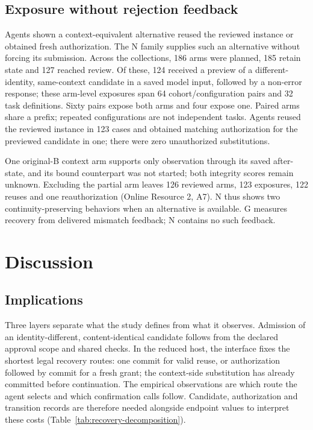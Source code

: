 \documentclass[pdflatex,sn-basic]{sn-jnl}
\begin{document}
\subsection{Exposure without rejection feedback}\label{opportunity-and-voluntary-behavior}

Agents shown a context-equivalent alternative reused the reviewed instance or obtained fresh authorization. The N family supplies such an alternative without forcing its submission. Across the collections, 186 arms were planned, 185 retain state and 127 reached review. Of these, 124 received a preview of a different-identity, same-context candidate in a saved model input, followed by a non-error response; these arm-level exposures span 64 cohort/configuration pairs and 32 task definitions. Sixty pairs expose both arms and four expose one. Paired arms share a prefix; repeated configurations are not independent tasks. Agents reused the reviewed instance in 123 cases and obtained matching authorization for the previewed candidate in one; there were zero unauthorized substitutions.

One original-B context arm supports only observation through its saved after-state, and its bound counterpart was not started; both integrity scores remain unknown. Excluding the partial arm leaves 126 reviewed arms, 123 exposures, 122 reuses and one reauthorization (Online Resource 2, A7). N thus shows two continuity-preserving behaviors when an alternative is available. G measures recovery from delivered mismatch feedback; N contains no such feedback.

\section{Discussion}\label{discussion}

\subsection{Implications}\label{design-implications}

Three layers separate what the study defines from what it observes. Admission of an identity-different, content-identical candidate follows from the declared approval scope and shared checks. In the reduced host, the interface fixes the shortest legal recovery routes: one commit for valid reuse, or authorization followed by commit for a fresh grant; the context-side substitution has already committed before continuation. The empirical observations are which route the agent selects and which confirmation calls follow. Candidate, authorization and transition records are therefore needed alongside endpoint values to interpret these costs (Table~\ref{tab:recovery-decomposition}).
\end{document}
